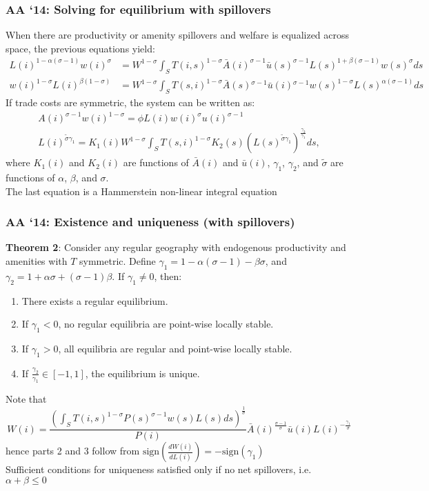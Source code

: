 \documentclass[10pt,notes=hide]{beamer}
\begin{document}
\begin{frame}
\frametitle{AA `14: Solving for equilibrium with spillovers}
When there are productivity or amenity spillovers and welfare is equalized across space, the previous equations yield:
\begin{align*}
L(i)^{1-\alpha(\sigma-1)}w(i)^{\sigma}&=W^{1-\sigma}\int_{S}T(i,s)^{1-\sigma}\bar{A}(i)^{\sigma-1}\bar{u}(s)^{\sigma-1}L(s)^{1+\beta(\sigma-1)}w(s)^{\sigma}ds \\ 
w(i)^{1-\sigma}L(i)^{\beta(1-\sigma)}&=W^{1-\sigma}\int_{S}T(s,i)^{1-\sigma}\bar{A}(s){}^{\sigma-1}\bar{u}(i){}^{\sigma-1}w(s)^{1-\sigma}L(s)^{\alpha(\sigma-1)}ds
\end{align*}
If trade costs are symmetric, the system can be written as:
\begin{align}
A(i)^{\sigma-1}w(i)^{1-\sigma} =\phi L(i)w(i)^{\sigma}u(i)^{\sigma-1} \label{eq:bla} \\
L(i)^{\tilde{\sigma}\gamma_{1}} =K_{1}(i)W^{1-\sigma}\int_{S}T\left(s,i\right)^{1-\sigma}K_{2}(s)\left(L(s)^{\tilde{\sigma}\gamma_{1}}\right)^{\frac{\gamma_{2}}{\gamma_{1}}}ds, 
\end{align}
where $K_{1}(i)$  and $K_{2}(i)$ are functions of $\bar{A}(i)$ and $\bar{u}(i)$, $\gamma_{1}$, $\gamma_{2}$, and $\tilde{\sigma}$ are functions of $\alpha$, $\beta$, and $\sigma$. 
\\
The last equation is a Hammerstein non-linear integral equation 
\end{frame}
\begin{frame}
\frametitle{AA `14: Existence and uniqueness (with spillovers)}
\textbf{Theorem 2}: Consider any regular geography with endogenous productivity and amenities with $T$ symmetric. Define $\gamma_{1} = 1-\alpha\left(\sigma-1\right)-\beta\sigma$, and $\gamma_{2} = 1+\alpha\sigma+\left(\sigma-1\right)\beta$. If $\gamma_{1}\neq0$, then:
\begin{enumerate}
\item There exists a regular equilibrium. 
\item If $\gamma_{1}<0$, no regular equilibria are point-wise locally stable.
\item If $\gamma_{1}>0$, all equilibria are regular and point-wise locally stable.\medskip
\item If $\frac{\gamma_{2}}{\gamma_{1}}\in\left[-1,1\right]$, the equilibrium is unique. 
\end{enumerate}
\vspace{5mm}
Note that
\begin{equation*}
W(i) = \frac{\left( \int_{S} T(i,s)^{1-\sigma}P(s)^{\sigma-1} w(s) L(s) ds  \right)^{\frac{1}{\sigma}}}{P(i)} \bar{A}(i)^{\frac{\sigma-1}{\sigma}}\bar{u}(i)L(i)^{-\frac{\gamma_{1}}{\sigma}}
\end{equation*}
hence parts 2 and 3 follow from $\text{sign}\left(\frac{dW(i)}{dL(i)}\right)=-\text{sign}(\gamma_1)$
\\ 
\vspace{1mm}
Sufficient conditions for uniqueness satisfied only if no net spillovers, i.e. $\alpha + \beta \leq 0$
\end{frame}
\end{document}
